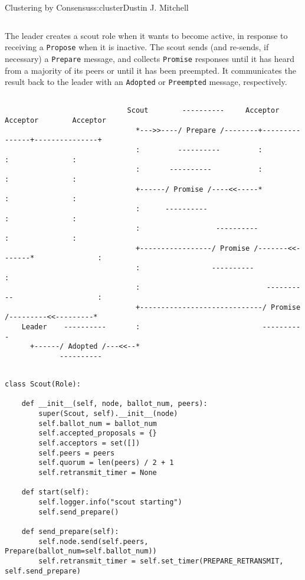 \begin{aosachapter}{Clustering by Consensus}{s:cluster}{Dustin J. Mitchell}
\begin{verbatim}
\end{verbatim}

The leader creates a scout role when it wants to become active, in
response to receiving a \texttt{Propose} when it is inactive. The scout
sends (and re-sends, if necessary) a \texttt{Prepare} message, and
collects \texttt{Promise} responses until it has heard from a majority
of its peers or until it has been preempted. It communicates the result
back to the leader with an \texttt{Adopted} or \texttt{Preempted}
message, respectively.

\begin{verbatim}

                             Scout        ----------     Acceptor        Acceptor        Acceptor
                               *--->>----/ Prepare /--------+---------------+---------------+
                               :         ----------         :               :               :
                               :       ----------           :               :               :
                               +------/ Promise /----<<-----*               :               :
                               :      ----------                            :               :
                               :                  ----------                :               :
                               +-----------------/ Promise /-------<<-------*               :
                               :                 ----------                                 :
                               :                              ----------                    :
                               +-----------------------------/ Promise /---------<<---------*
    Leader    ----------       :                             ---------- 
      +------/ Adopted /---<<--*
             ----------   
\end{verbatim}

\begin{verbatim}

class Scout(Role):

    def __init__(self, node, ballot_num, peers):
        super(Scout, self).__init__(node)
        self.ballot_num = ballot_num
        self.accepted_proposals = {}
        self.acceptors = set([])
        self.peers = peers
        self.quorum = len(peers) / 2 + 1
        self.retransmit_timer = None

    def start(self):
        self.logger.info("scout starting")
        self.send_prepare()

    def send_prepare(self):
        self.node.send(self.peers, Prepare(ballot_num=self.ballot_num))
        self.retransmit_timer = self.set_timer(PREPARE_RETRANSMIT, self.send_prepare)


\end{verbatim}
\end{aosachapter}
